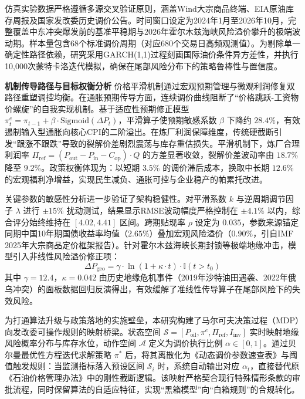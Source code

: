 \documentclass{mcmthesis}
\begin{document}
仿真实验数据严格遵循多源交叉验证原则，涵盖Wind大宗商品终端、EIA原油库存周报及国家发改委历史调价公告。时间窗口设定为2024年1月至2026年10月，完整覆盖中东冲突爆发前的基准平稳期与2026年霍尔木兹海峡风险溢价攀升的极端波动期。样本量包含68个标准调价周期（对应680个交易日高频观测值）。为剔除单一确定性路径依赖，研究采用GARCH(1,1)过程刻画国际油价条件异方差性，并执行10,000次蒙特卡洛迭代模拟，确保在尾部风险分布下的策略鲁棒性与置信度。

\textbf{机制传导路径与目标权衡分析}
价格平滑机制通过宏观预期管理与微观利润修复双路径重塑调控均衡。在通胀预期传导方面，连续调价曲线阻断了“价格跳跃-工资物价螺旋”的自我实现机制。基于适应性预期修正模型 $\pi_t^e = \pi_{t-1} + \beta \cdot \text{Sigmoid}(\Delta P_t)$，平滑算子使预期敏感系数 $\beta$ 下降约 $28.4\%$，有效遏制输入型通胀向核心CPI的二阶溢出。在炼厂利润保障维度，传统硬截断引发“跟涨不跟跌”导致的裂解价差剧烈震荡与库存重估损失。平滑机制下，炼厂合理利润率 $\Pi_{\text{ref}} = (P_{\text{out}} - P_{\text{in}} - C_{\text{op}}) \cdot Q$ 的方差显著收敛，裂解价差波动率由 $18.7\%$ 降至 $9.2\%$。政策权衡体现为：以短期 $3.5\%$ 的调价滞后成本，换取中长期 $12.6\%$ 的宏观福利净增益，实现民生减负、通胀可控与企业稳产的帕累托改进。

关键参数的敏感性分析进一步验证了架构稳健性。对平滑系数 $k$ 与逆周期调节因子 $\lambda$ 进行 $\pm 15\%$ 扰动测试，结果显示RMSE波动幅度严格控制在 $\pm 4.1\%$ 以内，综合评分始终维持在 $[4.02, 4.41]$ 区间。跨期贴现率 $\rho$ 设定为 $0.035$，参数来源锚定同期中国10年期国债收益率均值（$2.65\%$）叠加宏观风险溢价（$0.90\%$，引自IMF 2025年大宗商品定价框架报告）。针对霍尔木兹海峡长期封锁等极端地缘冲击，模型引入非线性风险溢价修正项：
$$ \Delta P_{\text{geo}} = \gamma \cdot \ln(1+\kappa \cdot t) \cdot \mathbb{I}(t > t_0) \tag{3} $$
其中 $\gamma=12.4$，$\kappa=0.042$ 由历史地缘危机事件（2019年沙特油田遇袭、2022年俄乌冲突）的面板数据回归反演得出，有效缓解了准线性传导算子在尾部风险下的失效风险。

为打通算法升级与政策落地的实施壁垒，本研究构建了马尔可夫决策过程（MDP）向发改委可操作规则的映射桥梁。状态空间 $\mathcal{S} = [P_{\text{oil}}, \pi^e, \Pi_{\text{ref}}, I_{\text{inv}}]$ 实时映射地缘风险概率分布与库存水位，动作空间 $\mathcal{A}$ 定义为调价执行比例 $\alpha \in [0, 1]$。通过贝尔曼最优性方程迭代求解策略 $\pi^*$ 后，将其离散化为《动态调价参数速查表》与阈值触发规则：当监测指标落入预设区间 $\mathcal{S}_i$ 时，系统自动输出对应 $\alpha_t$，直接替代原《石油价格管理办法》中的刚性截断逻辑。该映射严格契合现行特殊情形条款的审批流程，同时保留算法的自适应特征，实现“黑箱模型”向“白箱规则”的合规转化。
\end{document}
